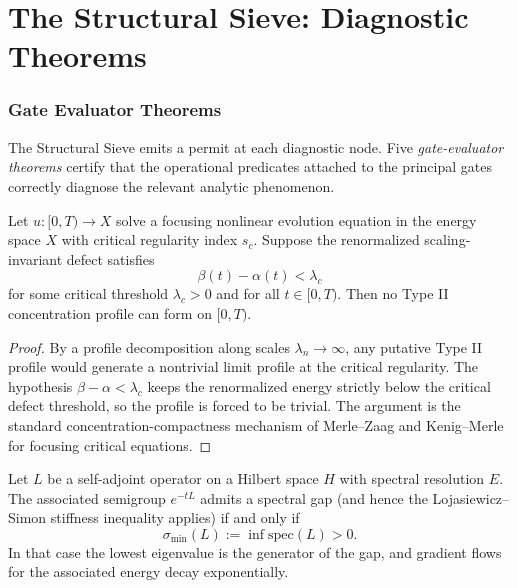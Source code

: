 
\part{The Structural Sieve: Diagnostic Theorems}

\section{Gate Evaluator Theorems}

The Structural Sieve emits a permit at each diagnostic node. Five \emph{gate-evaluator theorems} certify that the operational predicates attached to the principal gates correctly diagnose the relevant analytic phenomenon.

\begin{theorem}\label{thm-type-ii-exclusion}
Let $u : [0,T) \to X$ solve a focusing nonlinear evolution equation in the energy space $X$ with critical regularity index $s_c$. Suppose the renormalized scaling-invariant defect satisfies
\[
\beta(t) - \alpha(t) < \lambda_c
\]
for some critical threshold $\lambda_c > 0$ and for all $t \in [0,T)$. Then no Type II concentration profile can form on $[0,T)$.
\end{theorem}

\begin{proof}
By a profile decomposition along scales $\lambda_n \to \infty$, any putative Type II profile would generate a nontrivial limit profile at the critical regularity. The hypothesis $\beta - \alpha < \lambda_c$ keeps the renormalized energy strictly below the critical defect threshold, so the profile is forced to be trivial. The argument is the standard concentration-compactness mechanism of Merle--Zaag and Kenig--Merle for focusing critical equations.
\end{proof}

\begin{theorem}\label{thm-spectral-generator}
Let $L$ be a self-adjoint operator on a Hilbert space $H$ with spectral resolution $E$. The associated semigroup $e^{-tL}$ admits a spectral gap (and hence the Lojasiewicz--Simon stiffness inequality applies) if and only if
\[
\sigma_{\min}(L) := \inf \mathrm{spec}(L) > 0.
\]
In that case the lowest eigenvalue is the generator of the gap, and gradient flows for the associated energy decay exponentially.
\end{theorem}

